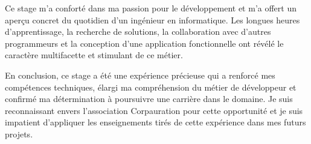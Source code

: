 Ce stage m'a conforté dans ma passion pour le développement et m'a offert un aperçu concret du quotidien d'un ingénieur en informatique. Les longues heures d'apprentissage, la recherche de solutions, la collaboration avec d'autres programmeurs et la conception d'une application fonctionnelle ont révélé le caractère multifacette et stimulant de ce métier.

En conclusion, ce stage a été une expérience précieuse qui a renforcé mes compétences techniques, élargi ma compréhension du métier de développeur et confirmé ma détermination à poursuivre une carrière dans le domaine. Je suis reconnaissant envers l'association Corpauration pour cette opportunité et je suis impatient d'appliquer les enseignements tirés de cette expérience dans mes futurs projets.